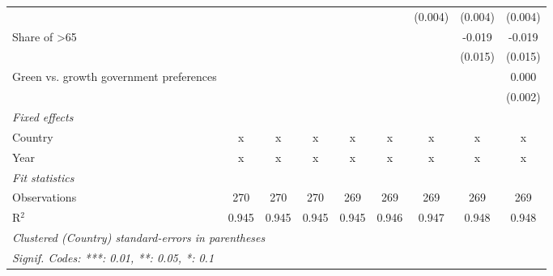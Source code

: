 \begin{table}[htbp]
\begin{tabular}{lcccccccc}
                                              &         &         &         &         &         & (0.004) & (0.004) & (0.004)\\   
      Share of >65                            &         &         &         &         &         &         & -0.019  & -0.019\\   
                                              &         &         &         &         &         &         & (0.015) & (0.015)\\   
      Green vs. growth government preferences &         &         &         &         &         &         &         & 0.000\\   
                                              &         &         &         &         &         &         &         & (0.002)\\   
      \emph{Fixed effects}\\
      Country                                 & x       & x       & x       & x       & x       & x       & x       & x\\  
      Year                                    & x       & x       & x       & x       & x       & x       & x       & x\\  
      \midrule \emph{Fit statistics}\\
      Observations                            & 270     & 270     & 270     & 269     & 269     & 269     & 269     & 269\\  
      R$^2$                                   & 0.945   & 0.945   & 0.945   & 0.945   & 0.946   & 0.947   & 0.948   & 0.948\\  
      \midrule
      \multicolumn{9}{l}{\emph{Clustered (Country) standard-errors in parentheses}}\\
      \multicolumn{9}{l}{\emph{Signif. Codes: ***: 0.01, **: 0.05, *: 0.1}}\\
   \end{tabular}
\end{table}


